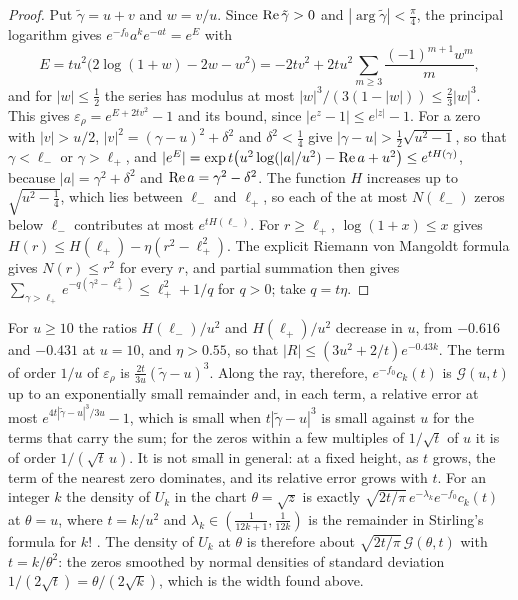 \begin{proof}
Put $\tilde\gamma=u+v$ and $w=v/u$. Since $\operatorname{Re}\tilde\gamma>0$ and $|\arg\tilde\gamma|<\frac\pi4$, the principal logarithm gives $e^{-f_0}a^ke^{-at}=e^E$ with
\[
E=tu^2\big(2\log(1+w)-2w-w^2\big)=-2tv^2+2tu^2\sum_{m\ge3}\frac{(-1)^{m+1}w^m}m ,
\]
and for $|w|\le\frac12$ the series has modulus at most $|w|^3/(3(1-|w|))\le\frac23|w|^3$. This gives $\varepsilon_\rho=e^{E+2tv^2}-1$ and its bound, since $|e^z-1|\le e^{|z|}-1$. For a zero with $|v|>u/2$, $|v|^2=(\gamma-u)^2+\delta^2$ and $\delta^2<\frac14$ give $|\gamma-u|>\frac12\sqrt{u^2-1}$, so that $\gamma<\ell_-$ or $\gamma>\ell_+$, and $|e^E|=\exp t\big(u^2\log(|a|/u^2)-\operatorname{Re} a+u^2\big)\le e^{tH(\gamma)}$, because $|a|=\gamma^2+\delta^2$ and $\operatorname{Re} a=\gamma^2-\delta^2$. The function $H$ increases up to $\sqrt{u^2-\frac14}$, which lies between $\ell_-$ and $\ell_+$, so each of the at most $N(\ell_-)$ zeros below $\ell_-$ contributes at most $e^{tH(\ell_-)}$. For $r\ge\ell_+$, $\log(1+x)\le x$ gives $H(r)\le H(\ell_+)-\eta(r^2-\ell_+^2)$. The explicit Riemann von Mangoldt formula \cite[Corollary~1.2]{HSW22} gives $N(r)\le r^2$ for every $r$, and partial summation then gives $\sum_{\gamma>\ell_+}e^{-q(\gamma^2-\ell_+^2)}\le\ell_+^2+1/q$ for $q>0$; take $q=t\eta$.
\end{proof}

For $u\ge10$ the ratios $H(\ell_-)/u^2$ and $H(\ell_+)/u^2$ decrease in $u$, from $-0.616$ and $-0.431$ at $u=10$, and $\eta>0.55$, so that $|R|\le(3u^2+2/t)e^{-0.43k}$. The term of order $1/u$ of $\varepsilon_\rho$ is $\frac{2t}{3u}(\tilde\gamma-u)^3$. Along the ray, therefore, $e^{-f_0}c_k(t)$ is $\mathcal G(u,t)$ up to an exponentially small remainder and, in each term, a relative error at most $e^{4t|\tilde\gamma-u|^3/3u}-1$, which is small when $t|\tilde\gamma-u|^3$ is small against $u$ for the terms that carry the sum; for the zeros within a few multiples of $1/\sqrt t$ of $u$ it is of order $1/(\sqrt t\,u)$. It is not small in general: at a fixed height, as $t$ grows, the term of the nearest zero dominates, and its relative error grows with $t$. For an integer $k$ the density of $U_k$ in the chart $\theta=\sqrt z$ is exactly $\sqrt{2t/\pi}\,e^{-\lambda_k}e^{-f_0}c_k(t)$ at $\theta=u$, where $t=k/u^2$ and $\lambda_k\in(\frac1{12k+1},\frac1{12k})$ is the remainder in Stirling's formula for $k!$ \cite{Robbins55}. The density of $U_k$ at $\theta$ is therefore about $\sqrt{2t/\pi}\,\mathcal G(\theta,t)$ with $t=k/\theta^2$: the zeros smoothed by normal densities of standard deviation $1/(2\sqrt t)=\theta/(2\sqrt k)$, which is the width found above.

